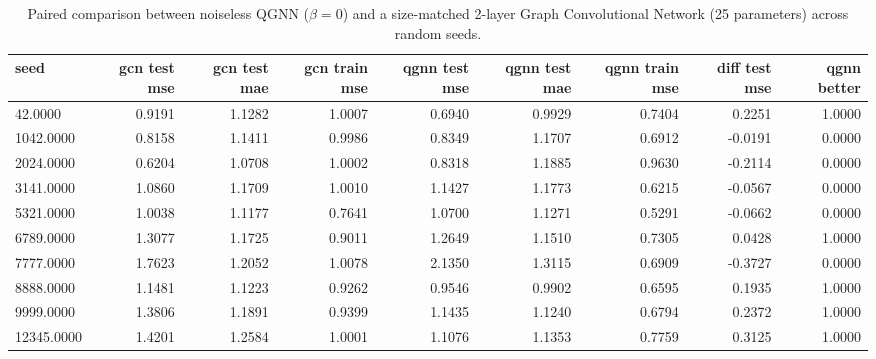 \begin{table}[htbp]
\centering
\caption{Paired comparison between noiseless QGNN ($\beta=0$) and a size-matched 2-layer Graph Convolutional Network (25 parameters) across random seeds.}
\label{tab:gcn_vs_qgnn}
\begin{tabular}{lrrrrrrrr}
\toprule
\textbf{seed} & \textbf{gcn test mse} & \textbf{gcn test mae} & \textbf{gcn train mse} & \textbf{qgnn test mse} & \textbf{qgnn test mae} & \textbf{qgnn train mse} & \textbf{diff test mse} & \textbf{qgnn better} \\
\midrule
42.0000 & 0.9191 & 1.1282 & 1.0007 & 0.6940 & 0.9929 & 0.7404 & 0.2251 & 1.0000 \\
1042.0000 & 0.8158 & 1.1411 & 0.9986 & 0.8349 & 1.1707 & 0.6912 & -0.0191 & 0.0000 \\
2024.0000 & 0.6204 & 1.0708 & 1.0002 & 0.8318 & 1.1885 & 0.9630 & -0.2114 & 0.0000 \\
3141.0000 & 1.0860 & 1.1709 & 1.0010 & 1.1427 & 1.1773 & 0.6215 & -0.0567 & 0.0000 \\
5321.0000 & 1.0038 & 1.1177 & 0.7641 & 1.0700 & 1.1271 & 0.5291 & -0.0662 & 0.0000 \\
6789.0000 & 1.3077 & 1.1725 & 0.9011 & 1.2649 & 1.1510 & 0.7305 & 0.0428 & 1.0000 \\
7777.0000 & 1.7623 & 1.2052 & 1.0078 & 2.1350 & 1.3115 & 0.6909 & -0.3727 & 0.0000 \\
8888.0000 & 1.1481 & 1.1223 & 0.9262 & 0.9546 & 0.9902 & 0.6595 & 0.1935 & 1.0000 \\
9999.0000 & 1.3806 & 1.1891 & 0.9399 & 1.1435 & 1.1240 & 0.6794 & 0.2372 & 1.0000 \\
12345.0000 & 1.4201 & 1.2584 & 1.0001 & 1.1076 & 1.1353 & 0.7759 & 0.3125 & 1.0000 \\
\bottomrule
\end{tabular}
\end{table}